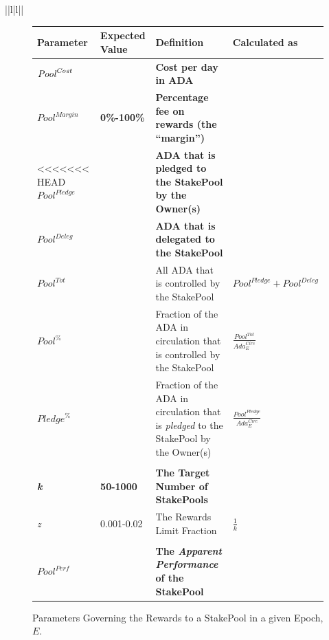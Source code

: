 \documentclass[11pt,a4paper,dvipsnames,twosided,final]{article}
\newcommand{\ada}{ADA{}}
\begin{document}
\begin{tabular}{||l|l||}
\begin{figure}[h!]
\begin{center}
\begin{tabular}{||l|l|p{6cm}|l||}
  \hline \hline
\textbf{Parameter} & \textbf{Expected Value} & \textbf{Definition} & \textbf{Calculated as} \\\hline
\textbf{\color{red} $\textit{\textit{Pool}}^{\textit{Cost}}$} &  & \textbf{\color{red} Cost per day in \ada{}} & \\\hline
\textbf{\color{red} ${\textit{Pool}}^{\textit{Margin}}$} &  \textbf{\color{red} 0\%-100\%} & \textbf{\color{red} Percentage fee on rewards (the ``margin'')} & \\\hline
<<<<<<< HEAD
\textbf{\color{red} ${Pool}^\textit{Pledge}$} & & \textbf{\color{red} \ada{} that is pledged to the StakePool by the Owner(s)} & \\\hline
\textbf{\color{blue} ${\textit{Pool}}^\textit{Deleg}$} & & \textbf{\color{blue} \ada{} that is delegated to the StakePool} & \\\hline
${\textit{Pool}}^{Tot}$ & & All \ada{} that is controlled by the StakePool & ${\textit{Pool}}^\textit{Pledge} + {\textit{Pool}}^\textit{Deleg}$ \\\hline
${\textit{Pool}}^\%$ & & Fraction of the \ada{} in circulation that is controlled by the StakePool & {\large $\frac{{\textit{Pool}}^{Tot}}{\textit{Ada}^{\textit{Circ}}_E}$} \\\hline
${\textit{Pledge}}^\%$ & & Fraction of the \ada{} in circulation that is \emph{pledged} to the StakePool by the Owner(s) & {\large $\frac{{\textit{Pool}}^{Pledge}}{\textit{Ada}^{\textit{Circ}}_E}$} \\\hline
&&&  \\\hline
\textbf{\color{green} \emph{k}} & \textbf{\color{green} 50-1000} & \textbf{\color{green} The Target Number of StakePools} & \\\hline
\emph{z} & 0.001-0.02 & The Rewards Limit Fraction & $\frac{1}{k}$ \\\hline
&&&  \\\hline
\textbf{\color{cyan} $\textit{Pool}^{\textit{Perf}}$} & & \textbf{\color{cyan} The \emph{Apparent Performance} of the StakePool} & \\\hline
  \hline
\end{tabular}
\end{center}
\caption{Parameters Governing the Rewards to a StakePool in a given Epoch, $E$.}
\label{fig:rewards-MainNet}
\end{figure}


\end{tabular}
\end{document}
